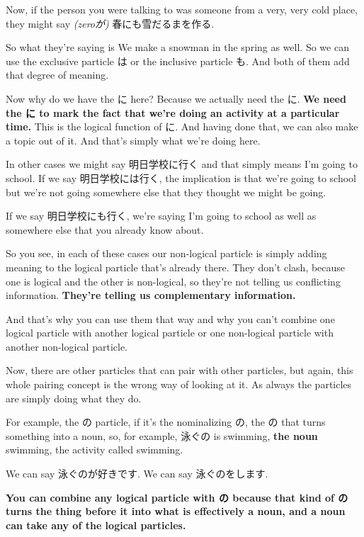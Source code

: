 Now, if the person you were talking to was someone from a very, very cold place, they might say {\em (zeroが)} 春にも雪だるまを作る.

{}

So what they're saying is We make a snowman in the spring as well. So we can use the exclusive particle は or the inclusive particle も. And both of them add that degree of meaning.

Now why do we have the に here? Because we actually need the に. {\bf We need the に to mark the fact that we're doing an activity at a particular time.} This is the logical function of に. And having done that, we can also make a topic out of it. And that's simply what we're doing here.

In other cases we might say 明日学校に行く and that simply means I'm going to school. If we say 明日学校には行く, the implication is that we're going to school but we're not going somewhere else that they thought we might be going.

If we say 明日学校にも行く, we're saying I'm going to school as well as somewhere else that you already know about.

So you see, in each of these cases our non-logical particle is simply adding meaning to the logical particle that's already there. They don't clash, because one is logical and the other is non-logical, so they're not telling us conflicting information. {\bf They're telling us complementary information.}

And that's why you can use them that way and why you can't combine one logical particle with another logical particle or one non-logical particle with another non-logical particle.

\thinrule

Now, there are other particles that can pair with other particles, but again, this whole pairing concept is the wrong way of looking at it. As always the particles are simply doing what they do.

For example, the の particle, if it's the nominalizing の, the の that turns something into a noun, so, for example, 泳ぐの is swimming, {\bf the noun} swimming, the activity called swimming.

{}

We can say 泳ぐのが好きです. We can say 泳ぐのをします.

{\bf You can combine any logical particle with の because that kind of の turns the thing before it into what is effectively a noun, and a noun can take any of the logical particles.}

